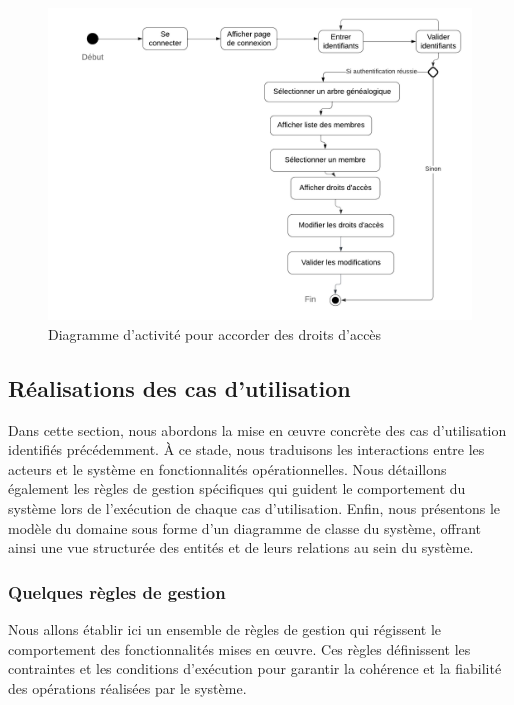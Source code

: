 \begin{figure}[H]
  \centering
  \includegraphics[width=1\textwidth]{figure/usecase2.png}
  \caption{Diagramme d'activité pour accorder des droits d'accès}
\end{figure}


\newpage
\subsection{Réalisations des cas d'utilisation}
Dans cette section, nous abordons la mise en œuvre concrète des cas
d’utilisation identifiés précédemment. À ce stade, nous traduisons les
interactions entre les acteurs et le système en fonctionnalités opérationnelles.
Nous détaillons également les règles de gestion spécifiques qui guident le
comportement du système lors de l’exécution de chaque cas d’utilisation. Enfin,
nous présentons le modèle du domaine sous forme d’un diagramme de classe du
système, offrant ainsi une vue structurée des entités et de leurs relations
au sein du système.
\subsubsection{Quelques règles de gestion}

Nous allons établir ici un ensemble de règles de gestion qui régissent le
comportement des fonctionnalités mises en œuvre. Ces règles définissent les
contraintes et les conditions d’exécution pour garantir la cohérence et la
fiabilité des opérations réalisées par le système.


